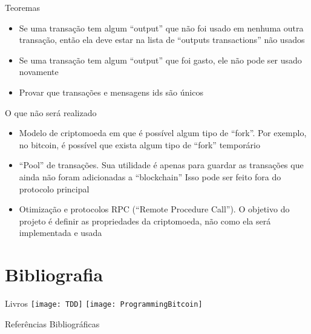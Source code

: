 \documentclass{beamer}
\begin{document}
\begin{frame}{Teoremas}
  \begin{itemize}
    \item Se uma transação tem algum \foreignquote{english}{output} que não foi usado em nenhuma outra transação, 
      então ela deve estar na lista de \foreignquote{english}{outputs transactions} não usados
    \item Se uma transação tem algum \foreignquote{english}{output} que foi gasto, ele não pode ser usado novamente
      \item Provar que transações e mensagens ids são únicos
  \end{itemize}
\end{frame}

\begin{frame}{O que não será realizado}
  \begin{itemize}
    \item Modelo de criptomoeda em que é possível algum tipo de \foreignquote{english}{fork}. Por exemplo, no bitcoin, é possível que exista algum tipo de \foreignquote{english}{fork} temporário
    \item \foreignquote{english}{Pool} de transações. Sua utilidade é apenas para guardar as transações que ainda não foram adicionadas a \foreignquote{english}{blockchain}
    Isso pode ser feito fora do protocolo principal
  \item Otimização e protocolos RPC (\foreignquote{english}{Remote Procedure Call}). O objetivo do projeto é definir as propriedades da criptomoeda, não como ela será implementada e usada
  \end{itemize}
\end{frame}

\section{Bibliografia}

 \begin{frame}{Livros}
    \texttt{[image: TDD]}
    \texttt{[image: ProgrammingBitcoin]}
 \end{frame}
  

\begin{frame}{Referências Bibliográficas}
  
  
\end{frame}
\end{document}
